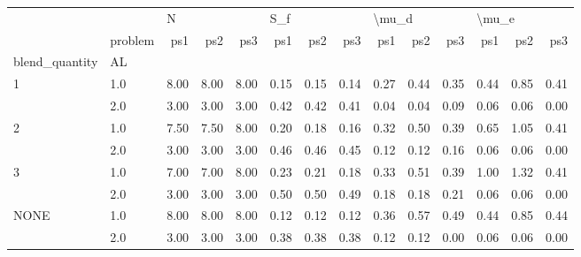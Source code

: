\begin{tabular}{llrrrrrrrrrrrr}
\toprule
     & {} & \multicolumn{3}{l}{N} & \multicolumn{3}{l}{S\_f} & \multicolumn{3}{l}{\textbackslash mu\_d} & \multicolumn{3}{l}{\textbackslash mu\_e} \\
     & problem &  ps1 &  ps2 &  ps3 &  ps1 &  ps2 &  ps3 &   ps1 &  ps2 &  ps3 &   ps1 &  ps2 &  ps3 \\
blend\_quantity & AL &      &      &      &      &      &      &       &      &      &       &      &      \\
\midrule
1 & 1.0 & 8.00 & 8.00 & 8.00 & 0.15 & 0.15 & 0.14 &  0.27 & 0.44 & 0.35 &  0.44 & 0.85 & 0.41 \\
     & 2.0 & 3.00 & 3.00 & 3.00 & 0.42 & 0.42 & 0.41 &  0.04 & 0.04 & 0.09 &  0.06 & 0.06 & 0.00 \\
2 & 1.0 & 7.50 & 7.50 & 8.00 & 0.20 & 0.18 & 0.16 &  0.32 & 0.50 & 0.39 &  0.65 & 1.05 & 0.41 \\
     & 2.0 & 3.00 & 3.00 & 3.00 & 0.46 & 0.46 & 0.45 &  0.12 & 0.12 & 0.16 &  0.06 & 0.06 & 0.00 \\
3 & 1.0 & 7.00 & 7.00 & 8.00 & 0.23 & 0.21 & 0.18 &  0.33 & 0.51 & 0.39 &  1.00 & 1.32 & 0.41 \\
     & 2.0 & 3.00 & 3.00 & 3.00 & 0.50 & 0.50 & 0.49 &  0.18 & 0.18 & 0.21 &  0.06 & 0.06 & 0.00 \\
NONE & 1.0 & 8.00 & 8.00 & 8.00 & 0.12 & 0.12 & 0.12 &  0.36 & 0.57 & 0.49 &  0.44 & 0.85 & 0.44 \\
     & 2.0 & 3.00 & 3.00 & 3.00 & 0.38 & 0.38 & 0.38 &  0.12 & 0.12 & 0.00 &  0.06 & 0.06 & 0.00 \\
\bottomrule
\end{tabular}
